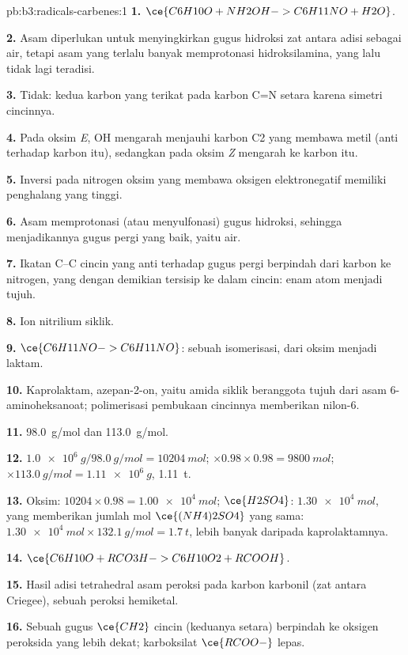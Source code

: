 \begin{solution}{pb:b3:radicals-carbenes:1}
\textbf{1.} $\ce{C6H10O + NH2OH -> C6H11NO + H2O}$.

\textbf{2.} Asam diperlukan untuk menyingkirkan gugus hidroksi zat antara adisi sebagai
air, tetapi asam yang terlalu banyak memprotonasi hidroksilamina, yang lalu tidak lagi teradisi.

\textbf{3.} Tidak: kedua karbon yang terikat pada karbon C=N setara karena
simetri cincinnya.

\textbf{4.} Pada oksim \textit{E}, OH mengarah menjauhi karbon C2 yang membawa metil (anti terhadap
karbon itu), sedangkan pada oksim \textit{Z} mengarah ke karbon itu.

\textbf{5.} Inversi pada nitrogen oksim yang membawa oksigen elektronegatif memiliki penghalang
yang tinggi.

\textbf{6.} Asam memprotonasi (atau menyulfonasi) gugus hidroksi, sehingga menjadikannya gugus pergi
yang baik, yaitu air.

\textbf{7.} Ikatan C--C cincin yang anti terhadap gugus pergi berpindah dari karbon ke nitrogen,
yang dengan demikian tersisip ke dalam cincin: enam atom menjadi tujuh.

\textbf{8.} Ion nitrilium siklik.

\textbf{9.} $\ce{C6H11NO -> C6H11NO}$: sebuah isomerisasi, dari oksim menjadi laktam.

\textbf{10.} Kaprolaktam, azepan-2-on, yaitu amida siklik beranggota tujuh dari
asam 6-aminoheksanoat; polimerisasi pembukaan cincinnya memberikan nilon-6.

\textbf{11.} \qty{98.0}{g/mol} dan \qty{113.0}{g/mol}.

\textbf{12.} $\qty{1.0e6}{g}/\qty{98.0}{g/mol} = \qty{10204}{mol}$; $\times 0.98 \times 0.98 = \qty{9800}{mol}$; $\times \qty{113.0}{g/mol} = \qty{1.11e6}{g}$, \qty{1.11}{t}.

\textbf{13.} Oksim: $\num{10204} \times 0.98 = \qty{1.00e4}{mol}$; $\ce{H2SO4}$: $\qty{1.30e4}{mol}$, yang memberikan jumlah mol
$\ce{(NH4)2SO4}$ yang sama: $\qty{1.30e4}{mol} \times \qty{132.1}{g/mol} = \qty{1.7}{t}$, lebih banyak daripada kaprolaktamnya.

\textbf{14.} $\ce{C6H10O + RCO3H -> C6H10O2 + RCOOH}$.

\textbf{15.} Hasil adisi tetrahedral asam peroksi pada karbon karbonil (zat antara
Criegee), sebuah peroksi hemiketal.

\textbf{16.} Sebuah gugus $\ce{CH2}$ cincin (keduanya setara) berpindah ke oksigen peroksida
yang lebih dekat; karboksilat $\ce{RCOO-}$ lepas.


\end{solution}
